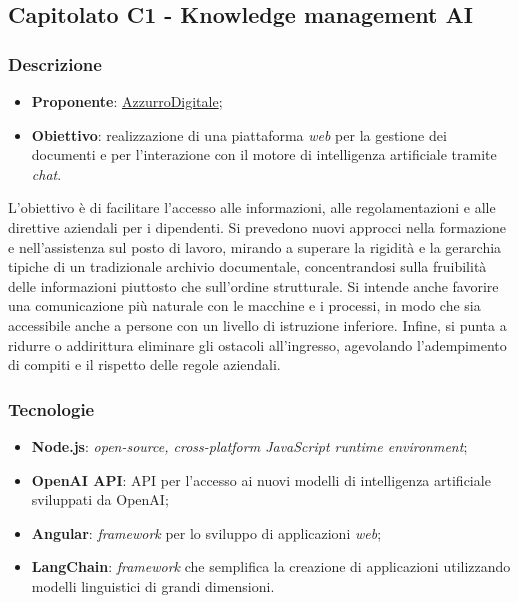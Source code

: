 \subsection{Capitolato C1 - Knowledge management AI}


\subsubsection{Descrizione}
\begin{itemize}
    \item \textbf{Proponente}: \href{https://www.azzurrodigitale.com/}{AzzurroDigitale};
    \item \textbf{Obiettivo}: realizzazione di una piattaforma \textit{web} per la gestione dei documenti e per l'interazione con il motore di intelligenza artificiale tramite \textit{chat}.
\end{itemize}
L'obiettivo è di facilitare l'accesso alle informazioni, alle regolamentazioni e alle direttive aziendali per i dipendenti. 
Si prevedono nuovi approcci nella formazione e nell'assistenza sul posto di lavoro, mirando a superare la rigidità e la gerarchia tipiche di un tradizionale archivio documentale, concentrandosi sulla fruibilità delle informazioni piuttosto che sull'ordine strutturale. 
Si intende anche favorire una comunicazione più naturale con le macchine e i processi, in modo che sia accessibile anche a persone con un livello di istruzione inferiore. 
Infine, si punta a ridurre o addirittura eliminare gli ostacoli all'ingresso, agevolando l'adempimento di compiti e il rispetto delle regole aziendali.

\subsubsection{Tecnologie}
\begin{itemize}
    \item \textbf{Node.js}: \textit{open-source, cross-platform JavaScript runtime environment};
    \item \textbf{OpenAI API}: API per l'accesso ai nuovi modelli di intelligenza artificiale sviluppati da OpenAI;
    \item \textbf{Angular}: \textit{framework} per lo sviluppo di applicazioni \textit{web};
    \item \textbf{LangChain}: \textit{framework} che semplifica la creazione di applicazioni utilizzando modelli linguistici di grandi dimensioni.
\end{itemize}


